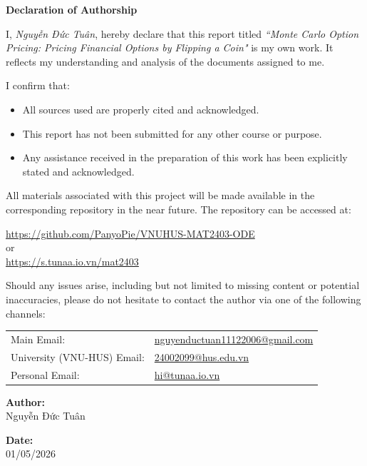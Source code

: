 \begin{center}
	{\Huge \textbf{Declaration of Authorship}}
	\vspace{1cm}
\end{center}

I, \textit{Nguyễn Đức Tuân}, hereby declare that this report titled\textit{ ``Monte Carlo Option Pricing: Pricing Financial Options by Flipping a Coin"} is my own work. It reflects my understanding and analysis of the documents assigned to me.

I confirm that:
\begin{itemize}
	\item All sources used are properly cited and acknowledged.
	\item This report has not been submitted for any other course or purpose.
	\item Any assistance received in the preparation of this work has been explicitly stated and acknowledged.
\end{itemize}

All materials associated with this project will be made available in the corresponding repository in the near future. The repository can be accessed at:
\begin{center}
	\url{https://github.com/PanyoPie/VNUHUS-MAT2403-ODE} \\
	or \\
	\url{https://s.tunaa.io.vn/mat2403}
\end{center}

Should any issues arise, including but not limited to missing content or potential inaccuracies, please do not hesitate to contact the author via one of the following channels:

\begin{tabular}{ll}
	Main Email:    & \href{mailto:nguyenductuan11122006@gmail.com}{nguyenductuan11122006@gmail.com} \\
	University (VNU-HUS) Email:  & \href{mailto:24002099@hus.edu.vn}{24002099@hus.edu.vn} \\
	Personal Email:& \href{mailto:hi@tunaa.io.vn}{hi@tunaa.io.vn} \\
\end{tabular}


\begin{flushright}
	\noindent
	\textbf{Author:} \\
	Nguyễn Đức Tuân
	
	\vspace{0.2cm}
	
	\noindent
	\textbf{Date:} \\
	01/05/2026
\end{flushright}